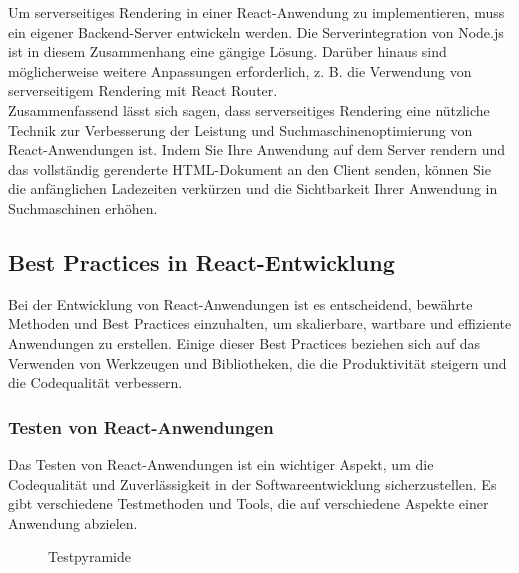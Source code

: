 Um serverseitiges Rendering in einer React-Anwendung zu implementieren, muss ein eigener Backend-Server entwickeln werden. Die Serverintegration von Node.js ist in diesem Zusammenhang eine gängige Lösung. Darüber hinaus sind möglicherweise weitere Anpassungen erforderlich, z. B. die Verwendung von serverseitigem Rendering mit React Router.\cite{Drehmanns2021}\\
Zusammenfassend lässt sich sagen, dass serverseitiges Rendering eine nützliche Technik zur Verbesserung der Leistung und Suchmaschinenoptimierung von React-Anwendungen ist. Indem Sie Ihre Anwendung auf dem Server rendern und das vollständig gerenderte HTML-Dokument an den Client senden, können Sie die anfänglichen Ladezeiten verkürzen und die Sichtbarkeit Ihrer Anwendung in Suchmaschinen erhöhen.

\subsection{Best Practices in React-Entwicklung}
 Bei der Entwicklung von React-Anwendungen ist es entscheidend, bewährte Methoden und Best Practices einzuhalten, um skalierbare, wartbare und effiziente Anwendungen zu erstellen. Einige dieser Best Practices beziehen sich auf das Verwenden von Werkzeugen und Bibliotheken, die die Produktivität steigern und die Codequalität verbessern. 
\subsubsection{Testen von React-Anwendungen}
Das Testen von React-Anwendungen ist ein wichtiger Aspekt, um die Codequalität und Zuverlässigkeit in der Softwareentwicklung sicherzustellen. Es gibt verschiedene Testmethoden und Tools, die auf verschiedene Aspekte einer Anwendung abzielen.\\
\begin{figure}[htbp]
	\centering
	\caption{Testpyramide}
\end{figure}

